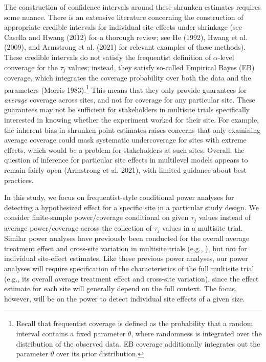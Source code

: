 \documentclass[]{article}
\begin{document}
The construction of confidence intervals around these shrunken estimates requires some nuance.
There is an extensive literature concerning the construction of appropriate credible intervals for individual site effects under shrinkage (see Casella and Hwang (2012) for a thorough review; see He (1992), Hwang et al. (2009), and Armstrong et al. (2021) for relevant examples of these methods).
These credible intervals do not satisfy the frequentist definition of $\alpha$-level converage for the $\tau_j$ values; instead, they satisfy so-called Empirical Bayes (EB) coverage, which integrates the coverage probability over both the data and the parameters (Morris 1983).\footnote{Recall that frequentist coverage is defined as the probability that a random interval contains a fixed parameter $\theta$, where randomness is integrated over the distribution of the observed data.
EB coverage additionally integrates out the parameter $\theta$ over its prior distribution.}
This means that they only provide guarantees for \textit{average} coverage across sites, and not for coverage for any particular site.
These guarantees may not be sufficient for stakeholders in multisite trials specifically interested in knowing whether the experiment worked for their site.
For example, the inherent bias in shrunken point estimates raises concerns that only examining average coverage could mask systematic undercoverage for sites with extreme effects, which would be a problem for stakeholders at such sites.
Overall, the question of inference for particular site effects in multilevel models appears to remain fairly open (Armstrong et al. 2021), with limited guidance about best practices.

In this study, we focus on frequentist-style conditional power analyses for detecting a hypothesized effect for a specific site in a particular study design.
We consider finite-sample power/coverage conditional on given $\tau_j$ values instead of average power/coverage across the collection of $\tau_j$ values in a multisite trial.
Similar power analyses have previously been conducted for the overall average treatment effect and cross-site variation in multisite trials (e.g., \citet{raudenbush2000statistical}), but not for individual site-effect estimates.
Like these previous power analyses, our power analyses will require specification of the characteristics of the full multisite trial (e.g., its overall average treatment effect and cross-site variation), since the effect estimate for each site will generally depend on the full context.
The focus, however, will be on the power to detect individual site effects of a given size.
\end{document}
